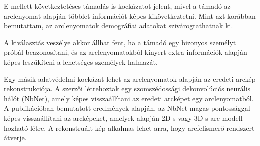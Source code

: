 E mellett következtetéses támadás is kockázatot jelent, mivel a támadó az arclenyomat alapján többlet információt képes kikövetkeztetni. Mint azt korábban bemutattam, az arclenyomatok demográfiai adatokat szivárogtathatnak ki. 

A kiválasztás veszélye akkor állhat fent, ha a támadó egy bizonyos személyt próbál beazonosítani, és az arclenyomatokból kinyert extra információk alapján képes leszűkíteni a lehetséges személyek halmazát.

Egy másik adatvédelmi kockázat lehet az arclenyomatok alapján az eredeti arckép rekonstrukciója. A \cite{mai2018reconstruction} szerzői létrehoztak egy szomszédossági dekonvolúciós neurális hálót (NbNet), amely képes visszaállítani az eredeti arcképet egy arclenyomatból. A publikációban bemutatott eredmények alapján, az NbNet magas pontossággal képes visszaállítani az arcképeket, amelyek alapján 2D-s vagy 3D-s arc modell hozható létre. A rekonstruált kép alkalmas lehet arra, hogy arcfelismerő rendszert átverje.




